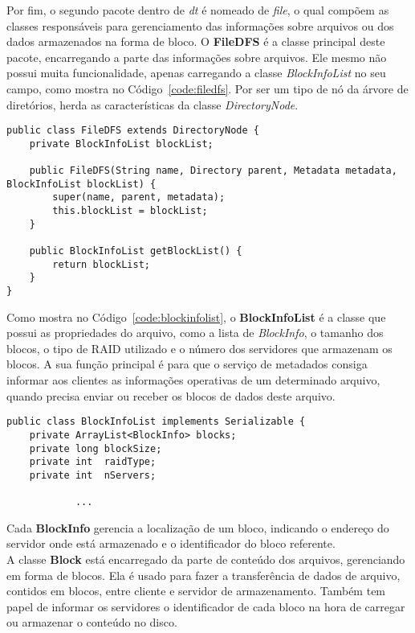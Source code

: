 Por fim, o segundo pacote dentro de \textit{dt} é nomeado de \textit{file}, o qual compõem as classes responsáveis para gerenciamento das informações sobre arquivos ou dos dados armazenados na forma de bloco. 
O \textbf{FileDFS} é a classe principal deste pacote, encarregando a parte das informações sobre arquivos.
Ele mesmo não possui muita funcionalidade, apenas carregando a classe \textit{BlockInfoList} no seu campo, como mostra no Código~\ref{code:filedfs}.
Por ser um tipo de nó da árvore de diretórios, herda as características da classe \textit{DirectoryNode}.
\begin{lstlisting}[basicstyle=\ttfamily\footnotesize, frame=single, caption=Classe FileDFS, label=code:filedfs]
public class FileDFS extends DirectoryNode {
	private BlockInfoList blockList;
	
	public FileDFS(String name, Directory parent, Metadata metadata, BlockInfoList blockList) {
		super(name, parent, metadata);	
		this.blockList = blockList;
	}
	
	public BlockInfoList getBlockList() {
		return blockList;
	}
}
\end{lstlisting}

Como mostra no Código~\ref{code:blockinfolist}, o \textbf{BlockInfoList} é a classe que possui as propriedades do arquivo, como a lista de \textit{BlockInfo}, o tamanho dos blocos, o tipo de RAID utilizado e o número dos servidores que armazenam os blocos.
A sua função principal é para que o serviço de metadados consiga informar aos clientes as informações operativas de um determinado arquivo, quando precisa enviar ou receber os blocos de dados deste arquivo.
\begin{lstlisting}[basicstyle=\ttfamily\footnotesize, frame=single, caption=Declaração e os campos da classe BlockInfoList, label=code:blockinfolist]
public class BlockInfoList implements Serializable {
	private ArrayList<BlockInfo> blocks;
	private long blockSize;
	private int  raidType;
	private int  nServers;
 
			...
\end{lstlisting}

Cada \textbf{BlockInfo} gerencia a localização de um bloco, indicando o endereço do servidor onde está armazenado e o identificador do bloco referente.
\\


A classe \textbf{Block} está encarregado da parte de conteúdo dos arquivos, gerenciando em forma de blocos.
Ela é usado para fazer a transferência de dados de arquivo, contidos em blocos, entre cliente e servidor de armazenamento.
Também tem papel de informar os servidores o identificador de cada bloco na hora de carregar ou armazenar o conteúdo no disco.

